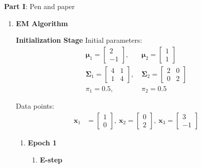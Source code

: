 \documentclass{article}
\begin{document}
\setcounter{page}{0}
\thispagestyle{empty}
\renewcommand{\thesection}{\Roman{section}}

\newpage




\large{\textbf{Part I}: Pen and paper}\normalsize

\begin{enumerate}[leftmargin=\labelsep]
\item \textbf{EM Algorithm}

\textbf{Initialization Stage}
Initial parameters:
\begin{align*}
\boldsymbol{\mu}_1 = \begin{bmatrix} 2 \\ -1 \end{bmatrix},&\ 
\boldsymbol{\mu}_2 = \begin{bmatrix} 1 \\ 1 \end{bmatrix} \\
\boldsymbol{\Sigma}_1 = \begin{bmatrix} 4 & 1 \\ 1 & 4 \end{bmatrix},&\ 
\boldsymbol{\Sigma}_2 = \begin{bmatrix} 2 & 0 \\ 0 & 2 \end{bmatrix} \\
\pi_1 = 0.5,& \ \pi_2 = 0.5
\end{align*}

Data points:
\begin{align*}
\mathbf{x}_1 &= \begin{bmatrix} 1 \\ 0 \end{bmatrix},\ 
\mathbf{x}_2 = \begin{bmatrix} 0 \\ 2 \end{bmatrix},\ 
\mathbf{x}_3 = \begin{bmatrix} 3 \\ -1 \end{bmatrix}
\end{align*}

\begin{enumerate}
\item \textbf{Epoch 1}
\begin{enumerate}
  \item \textbf{E-step}


\end{enumerate}
\end{enumerate}
\end{enumerate}
\end{document}
